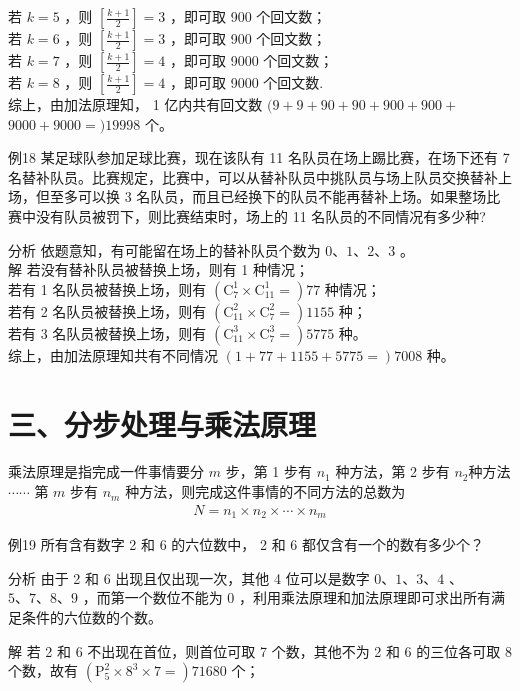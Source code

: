 \documentclass[10pt]{article}
\begin{document}
若 $k=5$ ，则 $\left[\frac{k+1}{2}\right]=3$ ，即可取 900 个回文数；\\
若 $k=6$ ，则 $\left[\frac{k+1}{2}\right]=3$ ，即可取 900 个回文数；\\
若 $k=7$ ，则 $\left[\frac{k+1}{2}\right]=4$ ，即可取 9000 个回文数；\\
若 $k=8$ ，则 $\left[\frac{k+1}{2}\right]=4$ ，即可取 9000 个回文数.\\
综上，由加法原理知， 1 亿内共有回文数 $(9+9+90+90+900+900+$ $9000+9000=) 19998$ 个。

例18 某足球队参加足球比赛，现在该队有 11 名队员在场上踢比赛，在场下还有 7 名替补队员。比赛规定，比赛中，可以从替补队员中挑队员与场上队员交换替补上场，但至多可以换 3 名队员，而且已经换下的队员不能再替补上场。如果整场比赛中没有队员被罚下，则比赛结束时，场上的 11 名队员的不同情况有多少种?

分析 依题意知，有可能留在场上的替补队员个数为 $0 、 1 、 2 、 3$ 。\\
解 若没有替补队员被替换上场，则有 1 种情况；\\
若有 1 名队员被替换上场，则有 $\left(\mathrm{C}_{7}^{1} \times \mathrm{C}_{11}^{1}=\right) 77$ 种情况；\\
若有 2 名队员被替换上场，则有 $\left(\mathrm{C}_{11}^{2} \times \mathrm{C}_{7}^{2}=\right) 1155$ 种；\\
若有 3 名队员被替换上场，则有 $\left(\mathrm{C}_{11}^{3} \times \mathrm{C}_{7}^{3}=\right) 5775$ 种。\\
综上，由加法原理知共有不同情况 $(1+77+1155+5775=) 7008$ 种。

\section{三、分步处理与乘法原理}
乘法原理是指完成一件事情要分 $m$ 步，第 1 步有 $n_{1}$ 种方法，第 2 步有 $n_{2}$种方法 $\cdots \cdots$ 第 $m$ 步有 $n_{m}$ 种方法，则完成这件事情的不同方法的总数为\\
\begin{align*}
N=n_{1} \times n_{2} \times \cdots \times n_{m}
\end{align*}

例19 所有含有数字 2 和 6 的六位数中， 2 和 6 都仅含有一个的数有多少个？

分析 由于 2 和 6 出现且仅出现一次，其他 4 位可以是数字 $0 、 1 、 3 、 4$ 、 $5 、 7 、 8 、 9$ ，而第一个数位不能为 0 ，利用乘法原理和加法原理即可求出所有满足条件的六位数的个数。

解 若 2 和 6 不出现在首位，则首位可取 7 个数，其他不为 2 和 6 的三位各可取 8 个数，故有 $\left(\mathrm{P}_{5}^{2} \times 8^{3} \times 7=\right) 71680$ 个；
\end{document}
